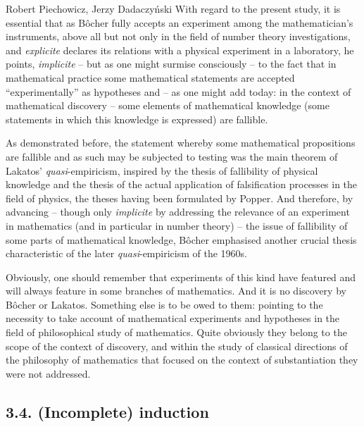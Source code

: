 \begin{artengenv}{Robert Piechowicz, Jerzy Dadaczyński}
With regard to the present study, it is essential that as Bôcher fully accepts an experiment among the mathematician's instruments, above all but not only in the field of number theory investigations, and \textit{explicite} declares its relations with a physical experiment in a laboratory, he points, \textit{implicite} – but as one might surmise consciously -- to the fact that in mathematical practice some mathematical statements are accepted ``experimentally'' as hypotheses and -- as one might add today: in the context of mathematical discovery -- some elements of mathematical knowledge (some statements in which this knowledge is expressed) are fallible.

As demonstrated before, the statement whereby some mathematical propositions are fallible and as such may be subjected to testing was the main theorem of Lakatos' \textit{quasi}-empiricism, inspired by the thesis of fallibility of physical knowledge and the thesis of the actual application of falsification processes in the field of physics, the theses having been formulated by Popper. And therefore, by advancing -- though only \textit{implicite} by addressing the relevance of an experiment in mathematics (and in particular in number theory) -- the issue of fallibility of some parts of mathematical knowledge, Bôcher emphasised another crucial thesis characteristic of the later \textit{quasi}-empiricism of the 1960s.

Obviously, one should remember that experiments of this kind have featured and will always feature in some branches of mathematics. And it is no discovery by Bôcher or Lakatos. Something else is to be owed to them: pointing to the necessity to take account of mathematical experiments and hypotheses in the field of philosophical study of mathematics. Quite obviously they belong to the scope of the context of discovery, and within the study of classical directions of the philosophy of mathematics that focused on the context of substantiation they were not addressed.

\subsection{3.4. (Incomplete) induction}


\end{artengenv}
